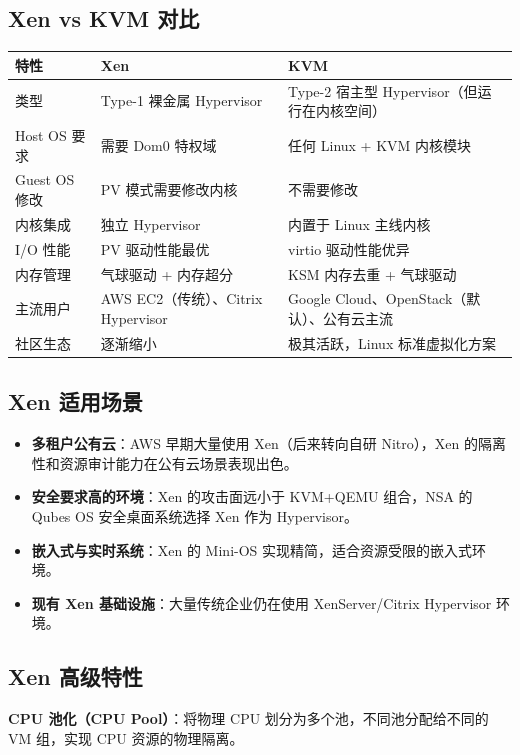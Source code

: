 \documentclass[12pt,UTF8]{ctexbook}
\begin{document}
\subsection*{Xen vs KVM 对比}

\begin{tabular}{|p{3cm}|p{5cm}|p{5cm}|}
\hline
\textbf{特性} & \textbf{Xen} & \textbf{KVM} \\
\hline
类型 & Type-1 裸金属 Hypervisor & Type-2 宿主型 Hypervisor（但运行在内核空间） \\
\hline
Host OS 要求 & 需要 Dom0 特权域 & 任何 Linux + KVM 内核模块 \\
\hline
Guest OS 修改 & PV 模式需要修改内核 & 不需要修改 \\
\hline
内核集成 & 独立 Hypervisor & 内置于 Linux 主线内核 \\
\hline
I/O 性能 & PV 驱动性能最优 & virtio 驱动性能优异 \\
\hline
内存管理 & 气球驱动 + 内存超分 & KSM 内存去重 + 气球驱动 \\
\hline
主流用户 & AWS EC2（传统）、Citrix Hypervisor & Google Cloud、OpenStack（默认）、公有云主流 \\
\hline
社区生态 & 逐渐缩小 & 极其活跃，Linux 标准虚拟化方案 \\
\hline
\end{tabular}

\subsection*{Xen 适用场景}

\begin{itemize}
    \item \textbf{多租户公有云}：AWS 早期大量使用 Xen（后来转向自研 Nitro），Xen 的隔离性和资源审计能力在公有云场景表现出色。
    \item \textbf{安全要求高的环境}：Xen 的攻击面远小于 KVM+QEMU 组合，NSA 的 Qubes OS 安全桌面系统选择 Xen 作为 Hypervisor。
    \item \textbf{嵌入式与实时系统}：Xen 的 Mini-OS 实现精简，适合资源受限的嵌入式环境。
    \item \textbf{现有 Xen 基础设施}：大量传统企业仍在使用 XenServer/Citrix Hypervisor 环境。
\end{itemize}

\subsection*{Xen 高级特性}

\textbf{CPU 池化（CPU Pool）}：将物理 CPU 划分为多个池，不同池分配给不同的 VM 组，实现 CPU 资源的物理隔离。
\end{document}
